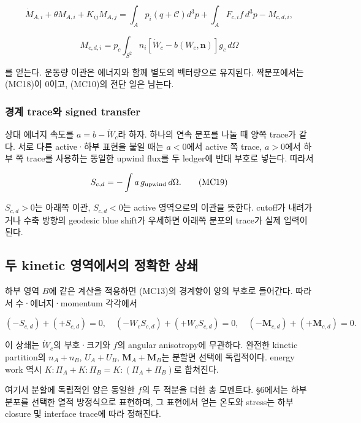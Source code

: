 \documentclass[11pt,a4paper]{article}
\begin{document}
\[
\dot M_{A,i}+\theta M_{A,i}+K_{ij}M_{A,j}
=\int_Ap_i(q+\mathcal C)d^3p
+\int_AF_{c,i}f\,d^3p-M_{c,d,i},
\tag{MC17}
\]

\[
M_{c,d,i}=p_c\int_{S^2}n_i
[\dot W_c-b(W_c,\boldsymbol n)]g_c\,d\Omega
\tag{MC18}
\]

를 얻는다. 운동량 이관은 에너지와 함께 별도의 벡터량으로 유지된다. 짝분포에서는 (MC18)이 0이고, (MC10)의 전단 일은 남는다.

\hypertarget{uxacbduxacc4-traceuxc640-signed-transfer}{%
\subsubsection{경계 trace와 signed transfer}\label{uxacbduxacc4-traceuxc640-signed-transfer}}

상대 에너지 속도를 \(a=b-\dot W_c\)라 하자. 하나의 연속 분포를 나눌 때 양쪽 trace가 같다. 서로 다른 active·하부 표현을 붙일 때는 \(a<0\)에서 active 쪽 trace, \(a>0\)에서 하부 쪽 trace를 사용하는 동일한 upwind flux를 두 ledger에 반대 부호로 넣는다. 따라서

\[
S_{c,d}=-\int a\,g_{\rm upwind}\,d\Omega.
\tag{MC19}
\]

\(S_{c,d}>0\)는 아래쪽 이관, \(S_{c,d}<0\)는 active 영역으로의 이관을 뜻한다. cutoff가 내려가거나 수축 방향의 geodesic blue shift가 우세하면 아래쪽 분포의 trace가 실제 입력이 된다.

\hypertarget{uxb450-kinetic-uxc601uxc5eduxc5d0uxc11cuxc758-uxc815uxd655uxd55c-uxc0c1uxc1c4}{%
\subsection{두 kinetic 영역에서의 정확한 상쇄}\label{uxb450-kinetic-uxc601uxc5eduxc5d0uxc11cuxc758-uxc815uxd655uxd55c-uxc0c1uxc1c4}}

하부 영역 \(B\)에 같은 계산을 적용하면 (MC13)의 경계항이 양의 부호로 들어간다. 따라서 수·에너지·momentum 각각에서

\[
(-S_{c,d})+(+S_{c,d})=0,
\quad(-W_cS_{c,d})+(+W_cS_{c,d})=0,
\quad(-\boldsymbol M_{c,d})+(+\boldsymbol M_{c,d})=0.
\tag{MC20}
\]

이 상쇄는 \(\dot W_c\)의 부호·크기와 \(f\)의 angular anisotropy에 무관하다. 완전한 kinetic partition의 \(n_A+n_B\), \(U_A+U_B\), \(\boldsymbol M_A+\boldsymbol M_B\)는 분할면 선택에 독립적이다. energy work 역시 \(K:\Pi_A+K:\Pi_B=K:(\Pi_A+\Pi_B)\)로 합쳐진다.

여기서 분할에 독립적인 양은 동일한 \(f\)의 두 적분을 더한 총 모멘트다. §6에서는 하부 분포를 선택한 열적 방정식으로 표현하며, 그 표현에서 얻는 온도와 stress는 하부 closure 및 interface trace에 따라 정해진다.
\end{document}
